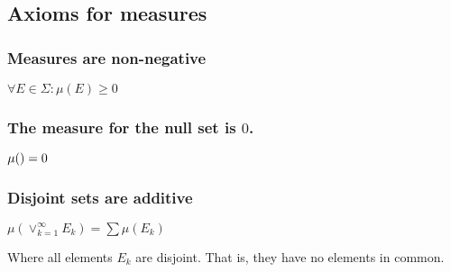 
\subsection{Axioms for measures}


\subsubsection{Measures are non-negative}

\(\forall E \in \Sigma : \mu (E)\ge 0\)

\subsubsection{The measure for the null set is \(0\).}

\(\mu (\null )=0\)

\subsubsection{Disjoint sets are additive}

\(\mu (\lor_{k=1}^{\infty} E_k)=\sum \mu (E_k)\)

Where all elements \(E_k\) are disjoint. That is, they have no elements in common.

